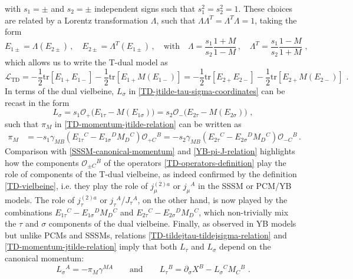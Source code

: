 \documentclass[12pt]{article}
\numberwithin{equation}{section}
\begin{document}
with $s_{1}=\pm$ and $s_{2}=\pm$ independent signs such that $s_{1}^2=s_{2}^2=1$. These choices are related by a Lorentz transformation $\Lambda$, such that $\Lambda\Lambda^{T}=\Lambda^{T}\Lambda=1$, taking the form
\begin{equation}
E_{1\pm}=\Lambda(E_{2\pm}) \, , 
\quad E_{2\pm}=\Lambda^{T}(E_{1\pm}) \, , \quad \text{with} \quad
\Lambda= \frac{s_{1}}{s_{2}}\frac{1+M}{1-M} \, , 
\quad 
\Lambda^{T}= \frac{s_{1}}{s_{2}}\frac{1-M}{1+M}\,\, ,
\end{equation}
which allows us to write the T-dual model as
\begin{equation}
\mathcal{L}_{\mathrm{TD}}=-\frac{1}{2}\mathrm{tr}[E_{1+}E_{1-}]-\frac{1}{2}\mathrm{tr}[E_{1+}M(E_{1-})]=-\frac{1}{2}\mathrm{tr}[E_{2+}E_{2-}]-\frac{1}{2}\mathrm{tr}[E_{2+}M(E_{2-})] \,\, .
\end{equation}
In terms of the dual vielbeine, $L_{\sigma}$ in \eqref{TD-jtilde-tau-sigma-coordinates} can be recast in the form 
\begin{equation}
L_{\sigma}=s_{1}\mathcal{O}_{+}\bigl( E_{1\tau}- M(E_{1\sigma})\bigr)=s_{2}\mathcal{O}_{-}\bigl( E_{2\tau}- M(E_{2\sigma})\bigr) \,\, ,
\end{equation}
such that $\pi_{M}$ in \eqref{TD-momentum-jtilde-relation} can be written as
\begin{equation}
\begin{aligned}
\pi_{M}&=-s_{1}\gamma_{MB}(E_{1\tau}{}^{C}\!-\!E_{1\sigma}{}^{D}M_{D}{}^{C})\mathcal{O}_{+C}{}^{B}
=-s_{2}\gamma_{MB}(E_{2\tau}{}^{C}\!-\!E_{2\sigma}{}^{D}M_{D}{}^{C})\mathcal{O}_{-C}{}^{B} \, .
\end{aligned}
\end{equation}
Comparison with \eqref{SSSM-canonical-momentum} and \eqref{YB-pi-J-relation} highlights how the components $\mathcal{O}_{\pm C}{}^{B}$ of the operators \eqref{TD-operators-definition} play the role of components of the T-dual vielbeine, as indeed confirmed by the definition \eqref{TD-vielbeine}, i.e. they play the role of $j_{\mu}^{(2)a}$ or $j_{\mu}{}^{A}$ in the SSSM or PCM/YB models. The role of $j_{\tau}^{(2)a}$ or $j_{\tau}{}^A$/$J_{\tau}{}^A$, on the other hand, is  now played by the combinations $E_{1\tau}{}^{C}-E_{1\sigma}{}^{D}M_{D}{}^{C}$ and $E_{2\tau}{}^{C}-E_{2\sigma}{}^{D}M_{D}{}^{C}$, which non-trivially mix the $\tau$ and $\sigma$ components of the dual vielbeine.
Finally, as observed in YB models but unlike PCMs and SSSMs, relations \eqref{TD-tildejtau-tildejsigma-relation} and \eqref{TD-momentum-jtilde-relation} imply that both $L_{\tau}$ and $L_{\sigma}$ depend on the canonical momentum:
\begin{equation}\label{TD-Jtau-and-Jsigma-functions-of-momentum}
L_{\sigma}{}^{A}=-\pi_{M}\gamma^{MA} 
\qquad \text{and} \qquad 
L_{\tau}{}^{B}=\partial_{\sigma}X^{B}-L_{\sigma}{}^{C}M_{C}{^{B}} \,\, .
\end{equation}
\end{document}

